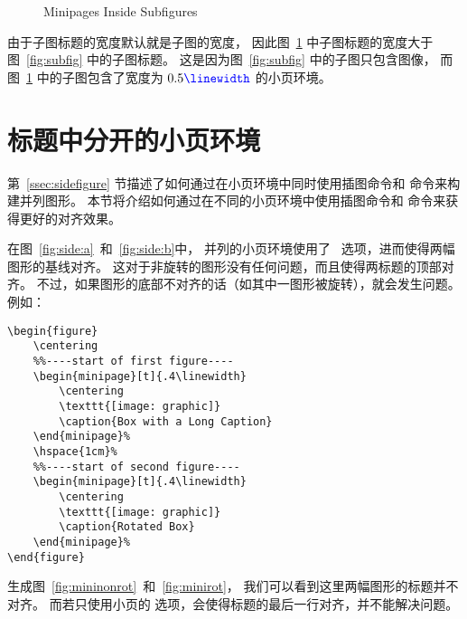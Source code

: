 \begin{figure}
		\hfill
			\caption{Minipages Inside Subfigures}
			\label{fig:mini:subfig} %
		\end{figure}

由于子图标题的宽度默认就是子图的宽度，
因此图~\ref{fig:mini:subfig} 中子图标题的宽度大于图~\ref{fig:subfig} 中的子图标题。
这是因为图~\ref{fig:subfig} 中的子图只包含图像，
而图~\ref{fig:mini:subfig} 中的子图包含了宽度为 $0.5\text{\cmd{linewidth}}$ 的小页环境。


\section{标题中分开的小页环境}

第~\ref{ssec:sidefigure} 节描述了如何通过在小页环境中同时使用插图命令和  命令来构建并列图形。
本节将介绍如何通过在不同的小页环境中使用插图命令和  命令来获得更好的对齐效果。

在图~\ref{fig:side:a}~和~\ref{fig:side:b}中，
并列的小页环境使用了 \opt{[t]}~选项，进而使得两幅图形的基线对齐。
这对于非旋转的图形没有任何问题，而且使得两标题的顶部对齐。
不过，如果图形的底部不对齐的话（如其中一图形被旋转），就会发生问题。例如：
\begin{lstlisting}
\begin{figure}
	\centering
	%%----start of first figure----
	\begin{minipage}[t]{.4\linewidth}
		\centering
		\texttt{[image: graphic]}
		\caption{Box with a Long Caption}
	\end{minipage}%
	\hspace{1cm}%
	%%----start of second figure----
	\begin{minipage}[t]{.4\linewidth}
		\centering
		\texttt{[image: graphic]}
		\caption{Rotated Box}
	\end{minipage}%
\end{figure}
\end{lstlisting}
生成图~\ref{fig:mininonrot}~和~\ref{fig:minirot}，
我们可以看到这里两幅图形的标题并不对齐。
而若只使用小页的 \opt{[b]} 选项，会使得标题的最后一行对齐，并不能解决问题。

